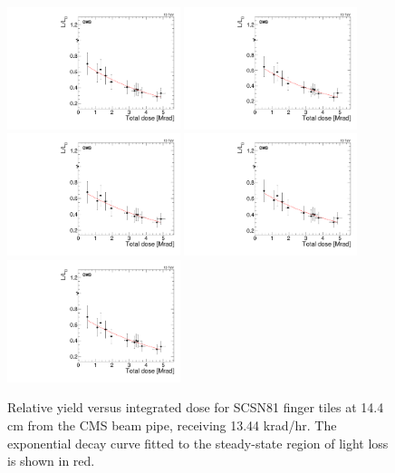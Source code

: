 \begin{figure}[tbp!]
\centering
\includegraphics[width=0.45\textwidth]{figures/SCSN81-F-14p4cm-f4ch3-dose.pdf}
\includegraphics[width=0.45\textwidth]{figures/SCSN81-F-14p4cm-f7ch0-dose.pdf}
\includegraphics[width=0.45\textwidth]{figures/SCSN81-F-14p4cm-f18ch0-dose.pdf}
\includegraphics[width=0.45\textwidth]{figures/SCSN81-F-14p4cm-f18ch1-dose.pdf}
\includegraphics[width=0.45\textwidth]{figures/SCSN81-F-14p4cm-f18ch2-dose.pdf}
\caption{Relative yield versus integrated dose for SCSN81 finger tiles at 14.4 cm from the CMS beam pipe, receiving 13.44 krad/hr. The exponential decay curve fitted to the steady-state region of light loss is shown in red.}
\label{fig:SCSN81-F-14p4cm-dose}
\end{figure} 

